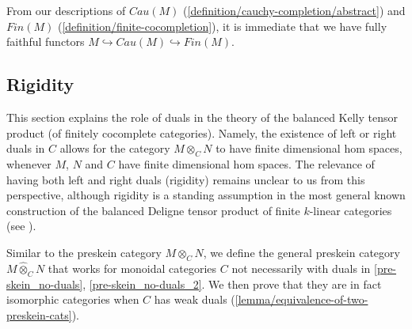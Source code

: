 \begin{remark}
  From our descriptions of $Cau(M)$
  (\ref{definition/cauchy-completion/abstract}) and $Fin(M)$
  (\ref{definition/finite-cocompletion}), it is immediate that we have fully
  faithful functors $M\hookrightarrow Cau(M)\hookrightarrow Fin(M)$.
\end{remark}

\subsection{Rigidity}

\noindent This section explains the role of duals in the theory of the
balanced Kelly tensor product (of finitely cocomplete categories). Namely, the
existence of left or right duals in $C$ allows for the category $M \otimes_C
N$ to have finite dimensional hom spaces, whenever $M$, $N$ and $C$ have
finite dimensional hom spaces. The relevance of having both left and right
duals (rigidity) remains unclear to us from this perspective, although
rigidity is a standing assumption in the most general known construction of
the balanced Deligne tensor product of finite $k$-linear categories (see
\cite{douglas/balanced-product}).

Similar to the preskein category $M \otimes_C N$, we define the general
preskein category $M \hat{\otimes}_C N$ that works for monoidal categories $C$
not necessarily with duals in \ref{pre-skein_no-duals},
\ref{pre-skein_no-duals_2}. We then prove that they are in fact isomorphic
categories when $C$ has weak duals
(\ref{lemma/equivalence-of-two-preskein-cats}).

